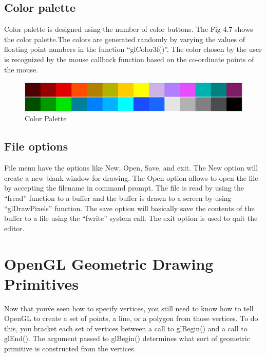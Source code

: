 \documentclass[12pt]{report}
\begin{document}
\subsection{Color palette}
Color palette is designed using the number of color buttons. The Fig 4.7 shows the color palette.The colors are generated randomly by varying the values of floating point numbers in the function “glColor3f()”. The color chosen by the user is recognized by the mouse callback function based on the co-ordinate points of the mouse.
 \begin{figure}[h!]
	\centering
		\includegraphics[scale=1.0]{color_pallete.png}
	\caption{Color Palette}
	\label{fig:logo2}
\end{figure}




\subsection{File options}
File menu have the options like New, Open, Save, and exit. The New option will create a new blank window for drawing.
The Open option allows to open the file by accepting the filename in command prompt. The file is read by using the “fread” function to a buffer and the buffer is drawn to a screen by using “glDrawPixels” function.
The save option will basically save the contents of the buffer to a file using the “fwrite” system call.
The exit option is used to quit the editor.


\section{OpenGL Geometric Drawing Primitives}
Now that you\'ve seen how to specify vertices, you still need to know how to tell OpenGL to create a set of points, a line, or a polygon from those vertices. To do this, you bracket each set of vertices between a call to glBegin() and a call to glEnd(). The argument passed to glBegin() determines what sort of geometric primitive is constructed from the vertices.
\end{document}
